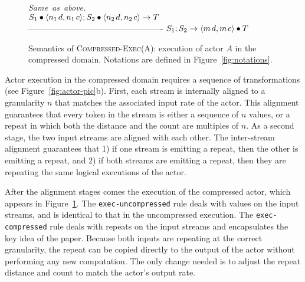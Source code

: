 \begin{figure}[t]
\hfill\mbox{\it Same as above.}\vspace{6pt}\\
$S_1 \bullet \langle n_1{\hspace{1.3pt}}d, n_1{\hspace{1.3pt}}c\rangle;S_2 \bullet \langle n_2{\hspace{1.3pt}}d, n_2{\hspace{1.3pt}}c\rangle \rightarrow T$ \skiptopb
------------------------------------------------- \skipbot
$S_1; S_2 \rightarrow \langle m{\hspace{1.3pt}}d, m{\hspace{1.3pt}}c\rangle \bullet T$
\caption{Semantics of \textsc{Compressed-Exec(A)}: execution of actor
$A$ in the compressed domain.
Notations are defined in Figure~\ref{fig:notations}.
\protect\label{fig:compressed-exec-rule}}
\end{figure}

Actor execution in the compressed domain requires a sequence of
transformations (see Figure~\ref{fig:actor-pic}b).  First, each stream
is internally aligned to a granularity $n$ that matches the associated
input rate of the actor.  This alignment guarantees that every token
in the stream is either a sequence of $n$ values, or a repeat in which
both the distance and the count are multiples of $n$.  As a second
stage, the two input streams are aligned with each other.  The
inter-stream alignment guarantees that 1) if one stream is emitting a
repeat, then the other is emitting a repeat, and 2) if both streams
are emitting a repeat, then they are repeating the same logical
executions of the actor.

After the alignment stages comes the execution of the compressed
actor, which appears in Figure~\ref{fig:compressed-exec-rule}.  The
{\tt exec-uncompressed} rule
deals with values on the input streams, and is identical to that in
the uncompressed execution.  The {\tt exec-compressed} rule deals with
repeats on the input streams and encapsulates the key idea of the
paper.  Because both inputs are repeating at the correct granularity,
the repeat can be copied directly to the output of the actor without
performing any new computation.  The only change needed is to adjust
the repeat distance and count to match the actor's output rate.

